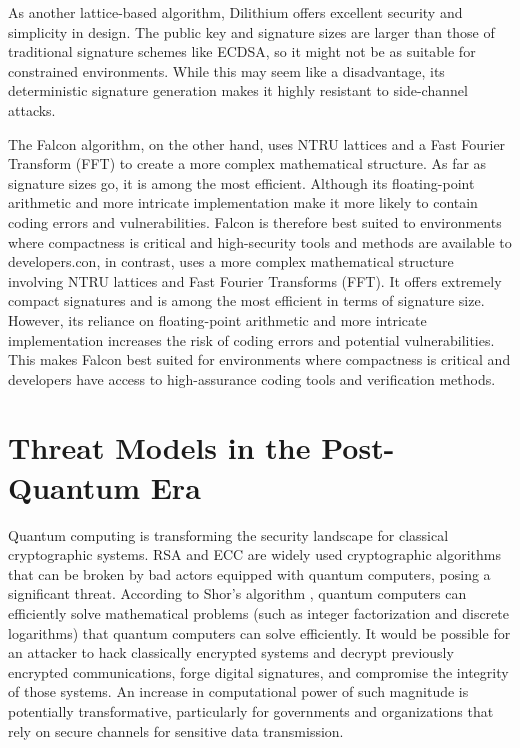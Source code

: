 \documentclass[conference]{IEEEtran}
\begin{document}
As another lattice-based algorithm, Dilithium offers excellent security and simplicity in design. The public key and signature sizes are larger than those of traditional signature schemes like ECDSA, so it might not be as suitable for constrained environments. While this may seem like a disadvantage, its deterministic signature generation makes it highly resistant to side-channel attacks.

The Falcon algorithm, on the other hand, uses NTRU lattices and a Fast Fourier Transform (FFT) to create a more complex mathematical structure. As far as signature sizes go, it is among the most efficient. Although its floating-point arithmetic and more intricate implementation make it more likely to contain coding errors and vulnerabilities. Falcon is therefore best suited to environments where compactness is critical and high-security tools and methods are available to developers.con, in contrast, uses a more complex mathematical structure involving NTRU lattices and Fast Fourier Transforms (FFT). It offers extremely compact signatures and is among the most efficient in terms of signature size. However, its reliance on floating-point arithmetic and more intricate implementation increases the risk of coding errors and potential vulnerabilities. This makes Falcon best suited for environments where compactness is critical and developers have access to high-assurance coding tools and verification methods.


\section{Threat Models in the Post-Quantum Era}

Quantum computing is transforming the security landscape for classical cryptographic systems. RSA and ECC are widely used cryptographic algorithms that can be broken by bad actors equipped with quantum computers, posing a significant threat. According to Shor's algorithm \cite{Shor1994}, quantum computers can efficiently solve mathematical problems (such as integer factorization and discrete logarithms) that quantum computers can solve efficiently. It would be possible for an attacker to hack classically encrypted systems and decrypt previously encrypted communications, forge digital signatures, and compromise the integrity of those systems. \cite{QuantumThreat}An increase in computational power of such magnitude is potentially transformative, particularly for governments and organizations that rely on secure channels for sensitive data transmission.
\end{document}
